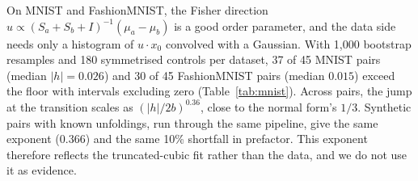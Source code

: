 On MNIST and FashionMNIST, the Fisher direction $u\propto(S_a+S_b+I)^{-1}(\mu_a-\mu_b)$ is a good order parameter, and the data side needs only a histogram of $u\cdot x_0$ convolved with a Gaussian. With 1{,}000 bootstrap resamples and 180 symmetrised controls per dataset, 37 of 45 MNIST pairs (median $|h|=0.026$) and 30 of 45 FashionMNIST pairs (median $0.015$) exceed the floor with intervals excluding zero (Table~\ref{tab:mnist}). Across pairs, the jump at the transition scales as $(|h|/2b)^{0.36}$, close to the normal form's $1/3$. Synthetic pairs with known unfoldings, run through the same pipeline, give the same exponent ($0.366$) and the same 10\% shortfall in prefactor. This exponent therefore reflects the truncated-cubic fit rather than the data, and we do not use it as evidence.

